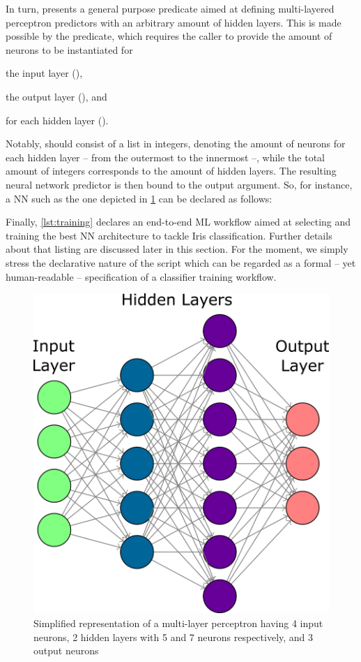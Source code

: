\documentclass[12pt,a4paper,openright,twoside]{book}
\begin{document}
In turn,  presents a general purpose predicate aimed at defining multi-layered perceptron predictors with an arbitrary amount of hidden layers.
%
This is made possible by the  predicate, which requires the caller to provide the amount of neurons to be instantiated for
%
\begin{inlinelist}
    \item the input layer (),
    \item the output layer (), and
    \item for each hidden layer ().
\end{inlinelist}
%
Notably,  should consist of a list in integers, denoting the amount of neurons for each hidden layer -- from the outermost to the innermost --, while the total amount of integers corresponds to the amount of hidden layers.
%
The resulting neural network predictor is then bound to the  output argument.
%
So, for instance, a NN such as the one depicted in \cref{fig:mlp} can be declared as follows:
%
\begin{center}
\end{center}

Finally, \cref{lst:training} declares an end-to-end ML workflow aimed at selecting and training the best NN architecture to tackle Iris classification.
%
Further details about that listing are discussed later in this section.
%
For the moment, we simply stress the declarative nature of the script which can be regarded as a formal -- yet human-readable -- specification of a classifier training workflow.

\begin{figure}
    \centering
    \includegraphics[width=.3\linewidth]{figures/mlp.png}
    \caption{Simplified representation of a multi-layer perceptron having 4 input neurons, 2 hidden layers with 5 and 7 neurons respectively, and 3 output neurons}
    \label{fig:mlp}
\end{figure}
\end{document}
